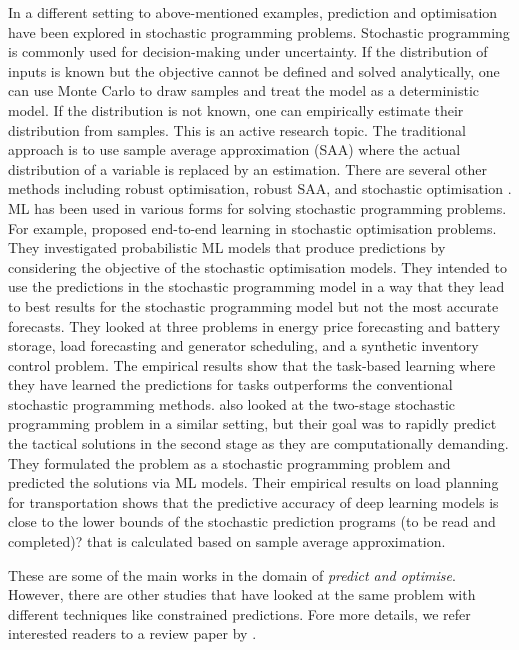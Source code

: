 \documentclass[graybox]{svmult}
\begin{document}
 
 In a different setting to above-mentioned examples, prediction and optimisation have been explored in stochastic programming problems.  Stochastic programming is commonly used for decision-making under uncertainty.  If the distribution of inputs is known but the objective cannot be defined and solved analytically, one can use Monte Carlo to draw samples and treat the model as a deterministic model. If the distribution is not known, one can empirically estimate their distribution from samples. This is an active research topic. The traditional approach is to use sample average approximation (SAA) where the actual distribution of a variable is replaced by an estimation.  There are several other methods including robust optimisation, robust SAA, and stochastic optimisation \cite{bertsimas2019machine}. ML has been used in various forms for solving stochastic programming problems. For example, \citet{donti2017task} proposed end-to-end learning in stochastic optimisation problems. They investigated probabilistic ML models that produce predictions by considering the objective of the stochastic optimisation models.  They intended to use the predictions in the stochastic programming model in a way that they lead to best results for the stochastic programming model but not the most accurate forecasts. They looked at three problems in energy price forecasting and battery storage, load forecasting and generator scheduling, and a synthetic inventory control problem. The empirical results show that the task-based learning where they have learned the predictions for tasks outperforms the conventional stochastic programming methods. \citet{larsen2022predicting} also looked at the two-stage stochastic programming problem in a similar setting, but their goal was to rapidly predict the tactical solutions in the second stage as they are computationally demanding. They formulated the problem as a stochastic programming problem and predicted the solutions via ML models. Their empirical results on load planning for transportation shows that the predictive accuracy  of deep learning models is close to the lower bounds of the stochastic prediction programs (to be read and completed)? that is calculated based on sample average approximation. 
 
 
These are some of the main works in the domain of \textit{predict and optimise}. However, there are other studies that have looked at the same problem with different techniques like constrained predictions. Fore more details, we refer interested readers to a review paper by \citet{Kotary_undated-mq}.
\end{document}
